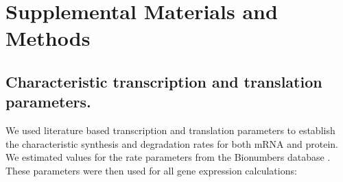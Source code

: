 \nolinenumbers
\section*{Supplemental Materials and Methods}

\subsection*{Characteristic transcription and translation parameters.}
We used literature based transcription and translation parameters to establish the characteristic synthesis and degradation rates for both mRNA and protein.
We estimated values for the rate parameters from the Bionumbers database \cite{Milo:2010aa}. These parameters were then used for all gene
expression calculations:

\lstset{basicstyle=\tiny,style=myCustomMatlabStyle}
